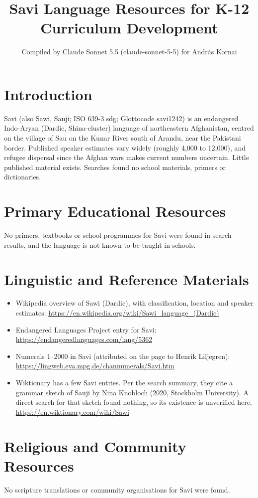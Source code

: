 \documentclass[12pt]{article}
\title{Savi Language Resources for K-12 Curriculum Development}
\author{Compiled by Claude Sonnet 5.5 (claude-sonnet-5-5) for Andr\'as Kornai}
\date{}
\begin{document}
\maketitle

\section{Introduction}
Savi (also Sawi, Sauji; ISO 639-3 sdg; Glottocode savi1242) is an endangered Indo-Aryan (Dardic, Shina-cluster) language of northeastern Afghanistan, centred on the village of Sau on the Kunar River south of Arandu, near the Pakistani border. Published speaker estimates vary widely (roughly 4,000 to 12,000), and refugee dispersal since the Afghan wars makes current numbers uncertain. Little published material exists. Searches found no school materials, primers or dictionaries.

\section{Primary Educational Resources}
No primers, textbooks or school programmes for Savi were found in search results, and the language is not known to be taught in schools.

\section{Linguistic and Reference Materials}
\begin{itemize}
\item Wikipedia overview of Sawi (Dardic), with classification, location and speaker estimates: \url{https://en.wikipedia.org/wiki/Sawi_language_(Dardic)}
\item Endangered Languages Project entry for Savi: \url{https://endangeredlanguages.com/lang/5362}
\item Numerals 1--2000 in Savi (attributed on the page to Henrik Liljegren): \url{https://lingweb.eva.mpg.de/channumerals/Savi.htm}
\item Wiktionary has a few Savi entries. Per the search summary, they cite a grammar sketch of Sauji by Nina Knobloch (2020, Stockholm University). A direct search for that sketch found nothing, so its existence is unverified here. \url{https://en.wiktionary.com/wiki/Sawi}
\end{itemize}

\section{Religious and Community Resources}
No scripture translations or community organisations for Savi were found.
\end{document}
